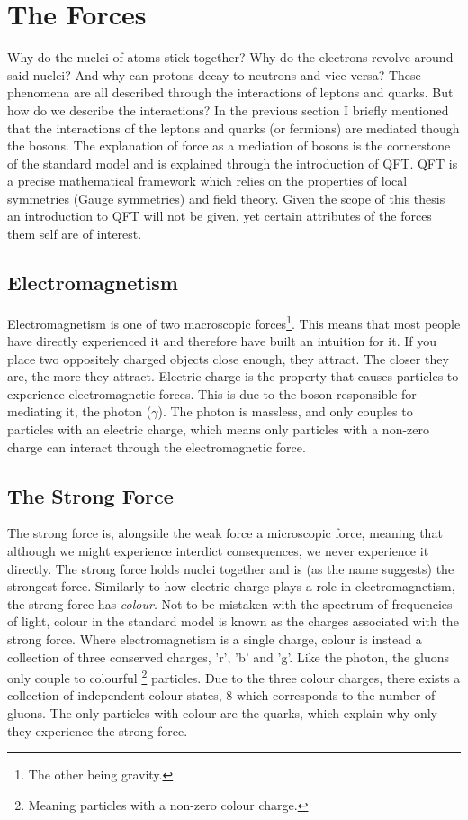 \section{The Forces}
Why do the nuclei of atoms stick together? Why do the electrons revolve
around said nuclei? And why can protons decay to neutrons and vice versa? These phenomena 
are all described through the interactions of leptons and quarks. But how do we describe the 
interactions? In the previous section I briefly mentioned that the interactions of the leptons 
and quarks (or fermions) are mediated though the bosons. The explanation of force as 
a mediation of bosons is the cornerstone of the standard model and is explained through 
the introduction of \ac{QFT}. \ac{QFT} is a precise mathematical framework which relies on the 
properties of local symmetries (Gauge symmetries) and field theory. Given the scope of this thesis
an introduction to \ac{QFT} will not be given, yet certain attributes of the forces them self
are of interest. 
\subsection{Electromagnetism}
Electromagnetism is one of two macroscopic forces\footnote{The other being gravity.}.
This means that most people have directly experienced it and therefore have built an intuition for
it. If you place two oppositely charged objects close enough, they attract. The closer they are, 
the more they attract. Electric charge is the property that causes particles to 
experience electromagnetic forces. This is due to the boson responsible for mediating it, 
the photon ($\gamma$). The photon is massless, and only couples to particles with an electric charge,
which means only particles with a non-zero charge can interact through the electromagnetic force.
\subsection{The Strong Force}
The strong force is, alongside the weak force a microscopic force, meaning that although 
we might experience interdict consequences, we never experience it directly. The strong force 
holds nuclei together and is (as the name suggests) the strongest force. Similarly to how electric 
charge plays a role in electromagnetism, the strong force has \emph{colour}. Not to be mistaken 
with the spectrum of frequencies of light, colour in the standard model is known as the charges 
associated with the strong force. Where electromagnetism is a single charge, colour is instead a collection 
of three conserved charges, 'r', 'b' and 'g'. Like the photon, the gluons only couple to colourful
\footnote{Meaning particles with a non-zero colour charge.} particles. Due to the three colour charges,
there exists a collection of independent colour states, 8 which corresponds to the number of gluons.
The only particles with colour are the quarks, which explain why only they experience the strong force. 
